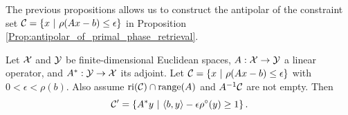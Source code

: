 The previous propositions allows us to construct the antipolar of the constraint set ${\mathcal C} = \{ x \ | \ \rho(Ax-b) \leq \epsilon \}$ in Proposition \ref{Prop:antipolar_of_primal_phase_retrieval}.

\begin{prop}		\label{Prop:antipolar_of_primal_phase_retrieval}
Let ${\mathcal X}$ and ${\mathcal Y}$ be finite-dimensional Euclidean spaces, $A : {\mathcal X} \rightarrow {\mathcal Y}$ a linear operator, and $A^* : {\mathcal Y} \rightarrow {\mathcal X}$ its adjoint.  Let ${\mathcal C} = \{ x \ | \ \rho(Ax-b) \leq \epsilon \}$ with $0 < \epsilon < \rho(b)$.  Also assume $\textnormal{ri}({\mathcal C}) \cap \textnormal{range}(A)$ and $A^{-1}{\mathcal C}$ are not empty. Then
\begin{equation}			\label{Eqn:antipolar_of_primal_phase_retrieval}
{\mathcal C}' = \left\{ A^*y \ | \ \langle b, y \rangle - \epsilon \rho^\circ(y) \geq 1  \right\}.	
\end{equation}
\end{prop}
